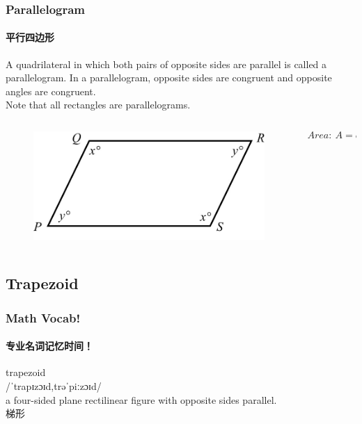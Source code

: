 \documentclass[
	11pt, %
]{beamer}
\begin{document}
	\begin{frame}
	\frametitle{Parallelogram} %
	\framesubtitle{平行四边形}
	\begin{definition}
		A quadrilateral in which both pairs of opposite sides are parallel
		is called a parallelogram. In a parallelogram, opposite sides are
		congruent and opposite angles are congruent. \\
		Note that all rectangles are parallelograms.
	\end{definition}

	\begin{columns}[t] 
		\begin{column}{0.5\textwidth} %
			\begin{figure}
				\includegraphics[width=\linewidth]{Parallelogram.jpg}
			\end{figure}
		\end{column}

		\begin{column}{0.5\textwidth} %
			\begin{equation*}
				Area:\ A = base \cdot height
			\end{equation*}
		\end{column}
	\end{columns}
\end{frame}


\subsection{Trapezoid}


\begin{frame}
	\frametitle{Math Vocab!} %
	\framesubtitle{专业名词记忆时间！}
	
	{\Huge trapezoid}\\
	{\LARGE /ˈtrapɪzɔɪd,trəˈpiːzɔɪd/\\
		\bigskip\bigskip
	a four-sided plane rectilinear figure with opposite sides parallel. \\ 
	梯形}

\end{frame}
\end{document}
